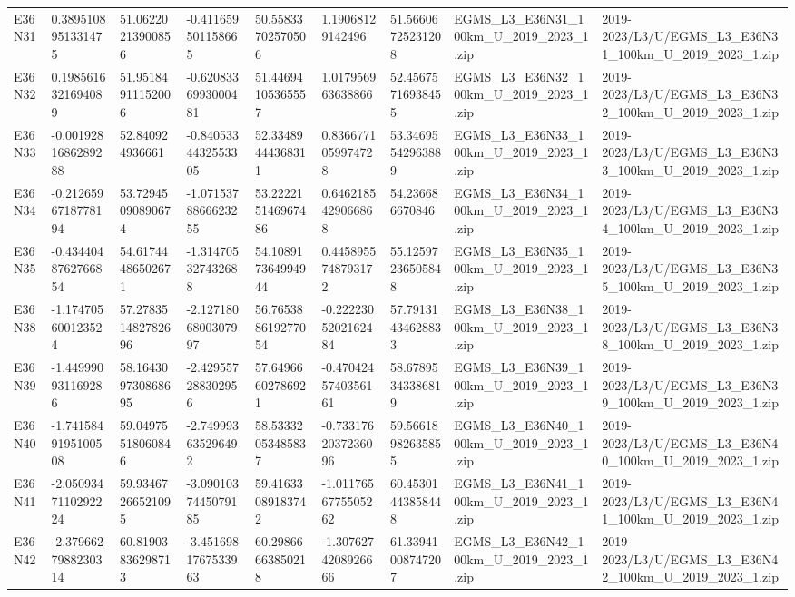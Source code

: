 \begin{landscape}
\begin{longtable}{lllllllll}
E36N31 & 0.3895108951331475 & 51.06220213900856 & -0.411659501158665 & 50.55833702570506 & 1.19068129142496 & 51.56606725231208 & EGMS\_L3\_E36N31\_100km\_U\_2019\_2023\_1.zip & 2019-2023/L3/U/EGMS\_L3\_E36N31\_100km\_U\_2019\_2023\_1.zip \\
E36N32 & 0.1985616321694089 & 51.95184911152006 & -0.6208336993000481 & 51.44694105365557 & 1.017956963638866 & 52.45675716938455 & EGMS\_L3\_E36N32\_100km\_U\_2019\_2023\_1.zip & 2019-2023/L3/U/EGMS\_L3\_E36N32\_100km\_U\_2019\_2023\_1.zip \\
E36N33 & -0.0019281686289288 & 52.840924936661 & -0.8405334432553305 & 52.33489444368311 & 0.8366771059974728 & 53.34695542963889 & EGMS\_L3\_E36N33\_100km\_U\_2019\_2023\_1.zip & 2019-2023/L3/U/EGMS\_L3\_E36N33\_100km\_U\_2019\_2023\_1.zip \\
E36N34 & -0.2126596718778194 & 53.72945090890674 & -1.0715378866623255 & 53.222215146967486 & 0.6462185429066868 & 54.236686670846 & EGMS\_L3\_E36N34\_100km\_U\_2019\_2023\_1.zip & 2019-2023/L3/U/EGMS\_L3\_E36N34\_100km\_U\_2019\_2023\_1.zip \\
E36N35 & -0.4344048762766854 & 54.61744486502671 & -1.314705327432688 & 54.108917364994944 & 0.4458955748793172 & 55.12597236505848 & EGMS\_L3\_E36N35\_100km\_U\_2019\_2023\_1.zip & 2019-2023/L3/U/EGMS\_L3\_E36N35\_100km\_U\_2019\_2023\_1.zip \\
E36N38 & -1.174705600123524 & 57.278351482782696 & -2.1271806800307997 & 56.765388619277054 & -0.2222305202162484 & 57.79131434628833 & EGMS\_L3\_E36N38\_100km\_U\_2019\_2023\_1.zip & 2019-2023/L3/U/EGMS\_L3\_E36N38\_100km\_U\_2019\_2023\_1.zip \\
E36N39 & -1.449990931169286 & 58.164309730868695 & -2.429557288302956 & 57.64966602786921 & -0.4704245740356161 & 58.67895343386819 & EGMS\_L3\_E36N39\_100km\_U\_2019\_2023\_1.zip & 2019-2023/L3/U/EGMS\_L3\_E36N39\_100km\_U\_2019\_2023\_1.zip \\
E36N40 & -1.7415849195100508 & 59.04975518060846 & -2.749993635296492 & 58.53332053485837 & -0.7331762037236096 & 59.56618982635855 & EGMS\_L3\_E36N40\_100km\_U\_2019\_2023\_1.zip & 2019-2023/L3/U/EGMS\_L3\_E36N40\_100km\_U\_2019\_2023\_1.zip \\
E36N41 & -2.0509347110292224 & 59.93467266521095 & -3.0901037445079185 & 59.41633089183742 & -1.0117656775505262 & 60.45301443858448 & EGMS\_L3\_E36N41\_100km\_U\_2019\_2023\_1.zip & 2019-2023/L3/U/EGMS\_L3\_E36N41\_100km\_U\_2019\_2023\_1.zip \\
E36N42 & -2.3796627988230314 & 60.81903836298713 & -3.4516981767533963 & 60.29866663850218 & -1.3076274208926666 & 61.33941008747207 & EGMS\_L3\_E36N42\_100km\_U\_2019\_2023\_1.zip & 2019-2023/L3/U/EGMS\_L3\_E36N42\_100km\_U\_2019\_2023\_1.zip \\

\end{longtable}
\end{landscape}
